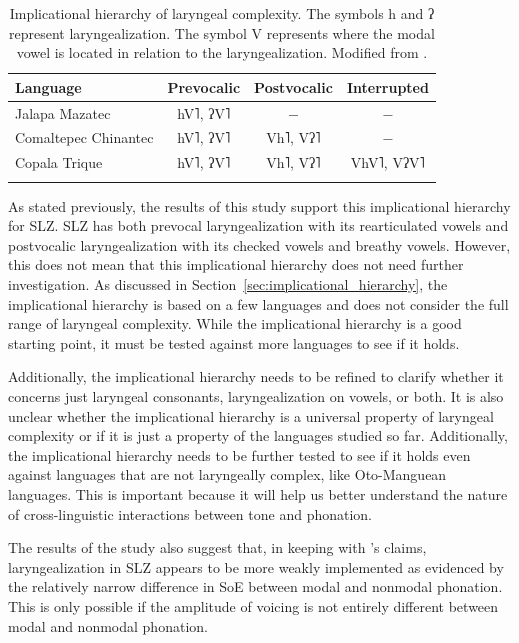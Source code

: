 \begin{table}[h!]
    \centering
    \caption{Implicational hierarchy of laryngeal complexity. The symbols h and ʔ represent laryngealization. The symbol V represents where the modal vowel is located in relation to the laryngealization. Modified from \citet{silvermanLaryngealComplexityOtomanguean1997}.} 
    \label{tab:implicational_hierarchy_repeat}
    \begin{tabular}{lccc}
        \lsptoprule
        \textbf{Language} & \textbf{Prevocalic} & \textbf{Postvocalic} & \textbf{Interrupted} \\
        \hline 
        Jalapa Mazatec & hV˥, ʔV˥ & $-$ & $-$ \\
        Comaltepec Chinantec & hV˥, ʔV˥ & Vh˥, Vʔ˥ & $-$ \\
        Copala Trique & hV˥, ʔV˥ & Vh˥, Vʔ˥ & VhV˥, VʔV˥ \\
        \lspbottomrule
    \end{tabular}
\end{table}

As stated previously, the results of this study support this implicational hierarchy for SLZ. SLZ has both prevocal laryngealization with its rearticulated vowels and postvocalic laryngealization with its checked vowels and breathy vowels. However, this does not mean that this implicational hierarchy does not need further investigation. As discussed in Section~\ref{sec:implicational_hierarchy}, the implicational hierarchy is based on a few languages and does not consider the full range of laryngeal complexity. While the implicational hierarchy is a good starting point, it must be tested against more languages to see if it holds.

Additionally, the implicational hierarchy needs to be refined to clarify whether it concerns just laryngeal consonants, laryngealization on vowels, or both. It is also unclear whether the implicational hierarchy is a universal property of laryngeal complexity or if it is just a property of the languages studied so far. Additionally, the implicational hierarchy needs to be further tested to see if it holds even against languages that are not laryngeally complex, like Oto-Manguean languages. This is important because it will help us better understand the nature of cross-linguistic interactions between tone and phonation.

The results of the study also suggest that, in keeping with \citeauthor{silvermanLaryngealComplexityOtomanguean1997}'s \citeyear{silvermanLaryngealComplexityOtomanguean1997} claims, laryngealization in SLZ appears to be more weakly implemented as evidenced by the relatively narrow difference in SoE between modal and nonmodal phonation. This is only possible if the amplitude of voicing is not entirely different between modal and nonmodal phonation.

